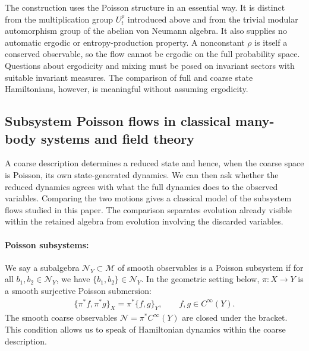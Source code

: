 \documentclass[a4paper,11pt]{article}
\theoremstyle{definition}
\begin{document}
The construction uses the Poisson structure in an essential way. It is distinct from the multiplication group $U_t^\rho$ introduced above and from the trivial modular automorphism group of the abelian von Neumann algebra. It also supplies no automatic ergodic or entropy-production property. A nonconstant $\rho$ is itself a conserved observable, so the flow cannot be ergodic on the full probability space. Questions about ergodicity and mixing must be posed on invariant sectors with suitable invariant measures. The comparison of full and coarse state Hamiltonians, however, is meaningful without assuming ergodicity.

\subsection{Subsystem Poisson flows in classical many-body systems and field theory}
\label{subsec:classical-subalgebra-Hamiltonian}

A coarse description determines a reduced state and hence, when the coarse space is Poisson, its own state-generated dynamics. We can then ask whether the reduced dynamics agrees with what the full dynamics does to the observed variables. Comparing the two motions gives a classical model of the subsystem flows studied in this paper. The comparison separates evolution already visible within the retained algebra from evolution involving the discarded variables.

\paragraph{Poisson subsystems:} We say a subalgebra $\mathcal N_Y\subset \mathcal M$ of smooth observables is a Poisson subsystem if for all $b_1,b_2\in \mathcal N_Y$, we have $\{b_1,b_2\}\in \mathcal N_Y$. In the geometric setting below, $\pi:X\to Y$ is a smooth surjective Poisson submersion:
\begin{align}\label{eq:classical-Poisson-subsystem}
    \{\pi^*f,\pi^*g\}_X=\pi^*\{f,g\}_Y,
    \qquad f,g\in C^\infty(Y).
\end{align}
The smooth coarse observables $\mathcal N=\pi^*C^\infty(Y)$ are closed under the bracket. This condition allows us to speak of Hamiltonian dynamics within the coarse description.
\end{document}
